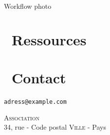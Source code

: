 \documentclass[12pt,nofoldmark,notumble]{leaflet}
\begin{document}
\clearpage

\begin{center}
  \setlength{\fboxsep}{0pt}%
  \setlength{\fboxrule}{0pt}%

  Workflow photo
\end{center}

\vspace*{\fill}

\section{\faInfoCircle  Ressources}

\begin{description}[align=right,labelwidth=4.2cm]

\item [Retouche photo] 

\item [Développement RAW] 

\item [PAO] 

\item [Logiciels] 

\item [Photo] 

\end{description}
   
\vspace*{\fill}

\section{\faEnvelope  Contact}

\texttt{adress@example.com}
\vspace*{\fill}
\begin{center}
{ \textsc{Association} \\ 34,
  rue - Code postal \textsc{Ville} - Pays}

\end{center}
\end{document}
